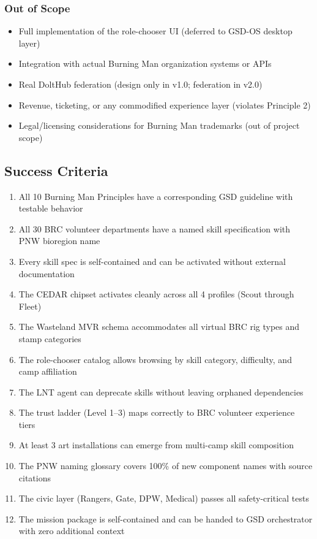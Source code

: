 \documentclass[11pt,letterpaper]{article}
\begin{document}
\subsubsection{Out of Scope}
\begin{itemize}[noitemsep]
  \item Full implementation of the role-chooser UI (deferred to GSD-OS desktop layer)
  \item Integration with actual Burning Man organization systems or APIs
  \item Real DoltHub federation (design only in v1.0; federation in v2.0)
  \item Revenue, ticketing, or any commodified experience layer (violates Principle 2)
  \item Legal/licensing considerations for Burning Man trademarks (out of project scope)
\end{itemize}

\subsection{Success Criteria}

\begin{enumerate}
  \item All 10 Burning Man Principles have a corresponding GSD guideline with testable behavior
  \item All 30 BRC volunteer departments have a named skill specification with PNW bioregion name
  \item Every skill spec is self-contained and can be activated without external documentation
  \item The CEDAR chipset activates cleanly across all 4 profiles (Scout through Fleet)
  \item The Wasteland MVR schema accommodates all virtual BRC rig types and stamp categories
  \item The role-chooser catalog allows browsing by skill category, difficulty, and camp affiliation
  \item The LNT agent can deprecate skills without leaving orphaned dependencies
  \item The trust ladder (Level 1--3) maps correctly to BRC volunteer experience tiers
  \item At least 3 art installations can emerge from multi-camp skill composition
  \item The PNW naming glossary covers 100\% of new component names with source citations
  \item The civic layer (Rangers, Gate, DPW, Medical) passes all safety-critical tests
  \item The mission package is self-contained and can be handed to GSD orchestrator with zero additional context
\end{enumerate}
\end{document}
